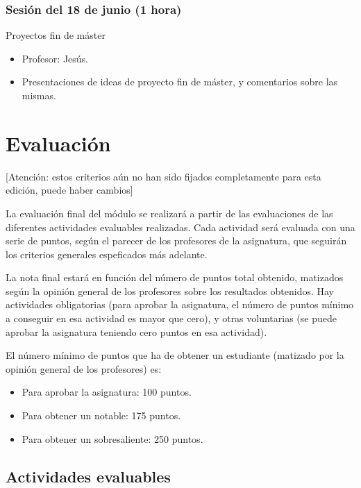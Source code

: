 \documentclass[a4paper,12pt]{article}
\begin{document}
\subsubsection{Sesión del 18 de junio (1 hora)}

Proyectos fin de máster

\begin{itemize}
\item Profesor: Jesús.
\item Presentaciones de ideas de proyecto fin de máster, y comentarios sobre las mismas.
\end{itemize}

\section{Evaluación}

[Atención: estos criterios aún no han sido fijados completamente para esta edición, puede haber cambios]

La evaluación final del módulo se realizará a partir de las evaluaciones de las diferentes actividades evaluables realizadas. Cada actividad será evaluada con una serie de puntos, según el parecer de los profesores de la asignatura, que seguirán los criterios generales espeficados más adelante.

La nota final estará en función del número de puntos total obtenido, matizados según la opinión general de los profesores sobre los resultados obtenidos. Hay actividades obligatorias (para aprobar la asignatura, el número de puntos mínimo a conseguir en esa actividad es mayor que cero), y otras voluntarias (se puede aprobar la asignatura teniendo cero puntos en esa actividad).

El número mínimo de puntos que ha de obtener un estudiante (matizado por la opinión general de los profesores) es:

\begin{itemize}
\item Para aprobar la asignatura: 100 puntos.
\item Para obtener un notable: 175 puntos.
\item Para obtener un sobresaliente: 250 puntos.
\end{itemize}

\subsection{Actividades evaluables}
\end{document}
